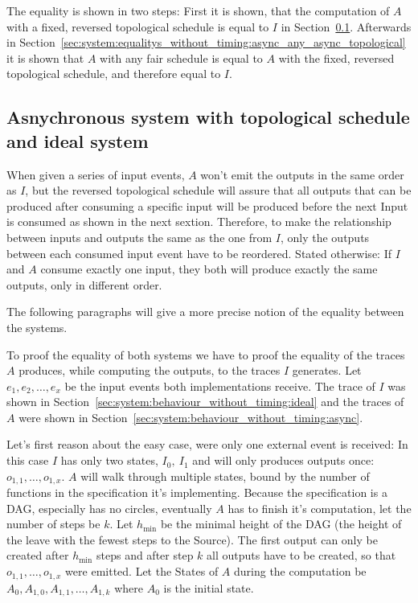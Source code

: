 The equality is shown in two steps: First it is shown, that the computation of \(A\) with a fixed, reversed topological
schedule is equal to \(I\) in Section~\ref{sec:system:equalitys_without_timing:ideal_async_topological}.
Afterwards in Section~\ref{sec:system:equalitys_without_timing:async_any_async_topological} it is shown that \(A\) with any fair schedule is equal to \(A\) with the fixed, reversed topological schedule,
and therefore equal to \(I\).

\subsection{Asnychronous system with topological schedule and ideal system}
\label{sec:system:equalitys_without_timing:ideal_async_topological}

When given a series of input events, \(A\) won't emit the outputs in the same order as \(I\),
but the reversed topological schedule will assure that all outputs that can be produced after consuming a specific input
will be produced before the next Input is consumed as shown in the next sextion.
Therefore, to make the relationship between inputs and outputs the same as the one from \(I\), only the outputs between
each consumed input event have to be reordered.
Stated otherwise: If \(I\) and \(A\) consume exactly one input, they both will produce exactly the same outputs,
only in different order.

The following paragraphs will give a more precise notion of the equality between the systems.

To proof the equality of both systems we have to proof the equality of the traces \(A\) produces, while computing the
outputs, to the traces \(I\) generates.
Let \(e_1, e_2, \dots, e_x\) be the input events both implementations receive.
The trace of \(I\) was shown in Section~\ref{sec:system:behaviour_without_timing:ideal} and the traces of \(A\) were shown in Section~\ref{sec:system:behaviour_without_timing:async}.


Let's first reason about the easy case, were only one external event is received:
In this case \(I\) has only two states, \(I_0,\ I_1\) and will only produces outputs once: \(o_{1,1}, \dots, o_{1,x}\).
\(A\) will walk through multiple states, bound by the number of functions in the specification it's implementing.
Because the specification is a DAG, especially has no circles, eventually \(A\) has to finish it's computation, let the
number of steps be \(k\).
Let \(h_{\min}\) be the minimal height of the DAG (the height of the leave with the fewest steps to the Source).
The first output can only be created after \(h_{\min}\) steps and after step \(k\) all outputs have to be created, so that
\(o_{1,1}, \dots, o_{1,x}\) were emitted.
Let the States of \(A\) during the computation be \(A_{0}, A_{1,0}, A_{1,1}, \dots, A_{1,k}\) where \(A_0\) is the initial state.

